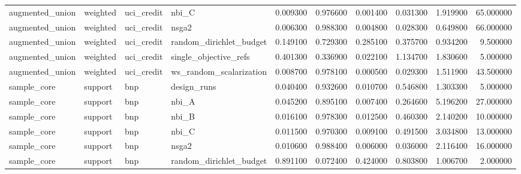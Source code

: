 \begin{landscape}
\begin{longtable}{llllrrrrrr}
augmented\_union & weighted & uci\_credit & nbi\_C & 0.009300 & 0.976600 & 0.001400 & 0.031300 & 1.919900 & 65.000000 \\
augmented\_union & weighted & uci\_credit & nsga2 & 0.006300 & 0.988300 & 0.004800 & 0.028300 & 0.649800 & 66.000000 \\
augmented\_union & weighted & uci\_credit & random\_dirichlet\_budget & 0.149100 & 0.729300 & 0.285100 & 0.375700 & 0.934200 & 9.500000 \\
augmented\_union & weighted & uci\_credit & single\_objective\_refs & 0.401300 & 0.336900 & 0.022100 & 1.134700 & 1.830600 & 5.000000 \\
augmented\_union & weighted & uci\_credit & ws\_random\_scalarization & 0.008700 & 0.978100 & 0.000500 & 0.029300 & 1.511900 & 43.500000 \\
sample\_core & support & bnp & design\_runs & 0.040400 & 0.932600 & 0.010700 & 0.546800 & 1.303300 & 5.000000 \\
sample\_core & support & bnp & nbi\_A & 0.045200 & 0.895100 & 0.007400 & 0.264600 & 5.196200 & 27.000000 \\
sample\_core & support & bnp & nbi\_B & 0.016100 & 0.978300 & 0.012500 & 0.460300 & 2.140200 & 10.000000 \\
sample\_core & support & bnp & nbi\_C & 0.011500 & 0.970300 & 0.009100 & 0.491500 & 3.034800 & 13.000000 \\
sample\_core & support & bnp & nsga2 & 0.010600 & 0.988400 & 0.006000 & 0.036000 & 2.116400 & 16.000000 \\
sample\_core & support & bnp & random\_dirichlet\_budget & 0.891100 & 0.072400 & 0.424000 & 0.803800 & 1.006700 & 2.000000 \\
\end{longtable}\endgroup\addtocounter{table}{-1}

\end{landscape}
